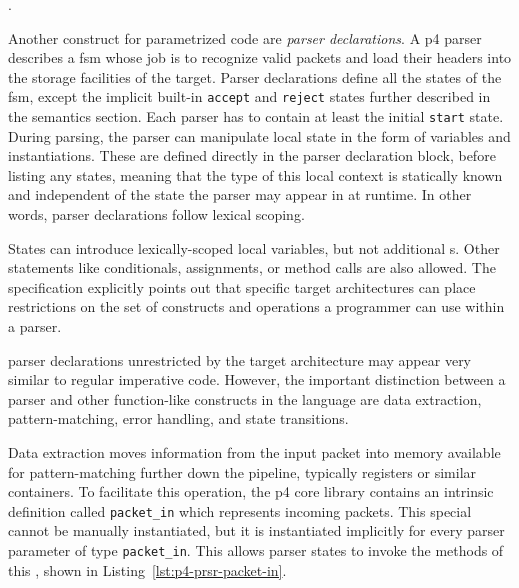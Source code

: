 .

Another construct for parametrized code are \emph{parser declarations}. A
\acrshort{p4} parser describes a \acrlong{fsm} whose job is to recognize valid
packets and load their headers into the storage facilities of the target. Parser
declarations define all the states of the \acrshort{fsm}, except the implicit
built-in \texttt{accept} and \texttt{reject} states further described in the
semantics section. Each parser has to contain at least the
initial \texttt{start} state. During parsing, the parser can manipulate local
state in the form of variables and \extern instantiations. These
are defined directly in the parser declaration block, before listing any states,
meaning that the type of this local context is statically known and independent
of the state the parser may appear in at runtime. In other words, parser
declarations follow lexical scoping.

States can introduce lexically-scoped local variables, but not additional
\extern{}s. Other statements like conditionals, assignments, or method calls are
also allowed. The specification explicitly points out that specific target
architectures can place restrictions on the set of constructs and operations a
programmer can use within a parser.

\pfs parser declarations unrestricted by the target architecture may appear very
similar to regular imperative code. However, the important distinction between a
parser and other function-like constructs in the \pfs language are data
extraction, pattern-matching, error handling, and state transitions.

Data extraction moves information from the input packet into memory available
for pattern-matching further down the pipeline, typically registers or similar
containers. To facilitate this operation, the \acrshort{p4} core library
contains an intrinsic \extern{} definition called \texttt{packet\_in}
which represents incoming packets. This special \extern cannot be manually
instantiated, but it is
instantiated implicitly for every parser parameter of type
\texttt{packet\_in}. This allows parser states to invoke the methods of this
\extern, shown in Listing~\ref{lst:p4-prsr-packet-in}.

